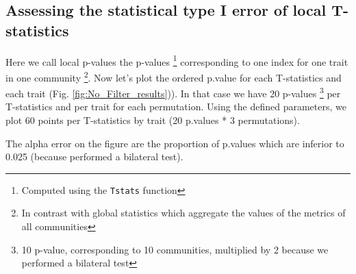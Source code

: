 \documentclass[12pt]{article}\usepackage[]{graphicx}\usepackage[]{color}
\begin{document}
 \subsection {Assessing the statistical type I error of local T-statistics}
 
Here we call local p-values the p-values \footnote{Computed using the \texttt{Tstats} function} corresponding to one index for one trait in one community \footnote{In contrast with global statistics which aggregate the values of the metrics of all communities}. Now let's plot the ordered p.value for each T-statistics and each trait (Fig. \ref{fig:No_Filter_results})). In that case we have 20 p-values \footnote{10 p-value, corresponding to 10 communities, multiplied by 2 because we performed a bilateral test} per T-statistics and per trait for each permutation. Using the defined parameters, we plot 60 points per T-statistics by trait (20 p.values * 3 permutations). 

The alpha error on the figure are the proportion of p.values which are inferior to 0.025 (because performed a bilateral test).
\end{document}
